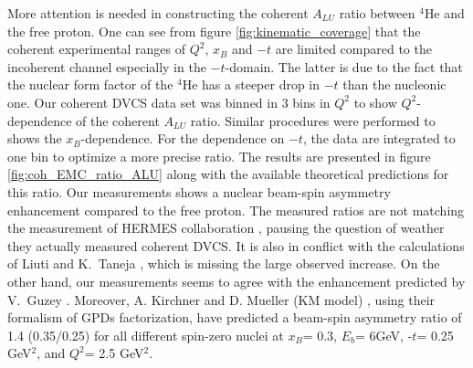  More attention is needed in constructing the coherent $A_{LU}$ ratio between 
 $^4$He and the free proton. One can see from figure 
 \ref{fig:kinematic_coverage} that the coherent experimental ranges of $Q^2$, 
 $x_{B}$ and $-t$ are limited compared to the incoherent channel especially in 
 the $-t$-domain. The latter is due to the fact that the nuclear form factor of 
 the $^4$He has a steeper drop in $-t$ than the nucleonic one. Our coherent 
 DVCS data set was binned in 3 bins in $Q^{2}$ to show
 $Q^{2}$-dependence of the coherent $A_{LU}$ ratio.  Similar procedures were 
 performed to shows the $x_B$-dependence. For the dependence on $-t$, the data 
 are integrated to one bin to optimize a more precise ratio. The results are 
 presented in figure \ref{fig:coh_EMC_ratio_ALU} along with the available 
 theoretical predictions for this ratio. Our measurements shows a nuclear 
 beam-spin asymmetry enhancement compared to the free proton. 
 The measured ratios are not matching the measurement of 
 HERMES collaboration \cite{HERMES_BSA}, pausing the question of weather they
 actually measured coherent DVCS. It is also in conflict with the calculations 
 of Liuti and K.~Taneja \cite{simonetta_2}, which is missing the large observed 
 increase. On the other hand, our measurements seems to agree with the 
 enhancement predicted by V.~Guzey \cite{EMC_vadim_4}.  Moreover, A.  Kirchner 
 and D. Mueller (KM model) \cite{Kir}, using their formalism of GPDs 
 factorization, have predicted a beam-spin asymmetry ratio of 1.4 (0.35/0.25) 
 for all different spin-zero nuclei at $x_{B}$= 0.3, $E_{b}$= 6GeV, -$t$= 0.25 
 GeV$^2$, and $Q^2$= 2.5 GeV$^2$.  



